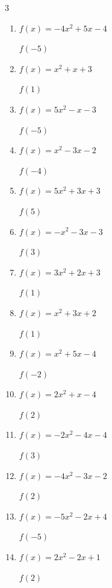 \begin{multicols}{3}
\begin{enumerate}
  \item $f(x)=-4x^{2}+5x-4$

$f(-5)$
        \phantom{$= -129$}

  \item $f(x)=x^{2}+x+3$

$f(1)$
        \phantom{$= 5$}

  \item $f(x)=5x^{2}-x-3$

$f(-5)$
        \phantom{$= 127$}

  \item $f(x)=x^{2}-3x-2$

$f(-4)$
        \phantom{$= 26$}

  \item $f(x)=5x^{2}+3x+3$

$f(5)$
        \phantom{$= 143$}

\columnbreak %

\resetques

  \item $f(x)=-x^{2}-3x-3$

$f(3)$
        \phantom{$= -21$}

  \item $f(x)=3x^{2}+2x+3$

$f(1)$
        \phantom{$= 8$}

  \item $f(x)=x^{2}+3x+2$

$f(1)$
        \phantom{$= 6$}

  \item $f(x)=x^{2}+5x-4$

$f(-2)$
        \phantom{$= -10$}

  \item $f(x)=2x^{2}+x-4$

$f(2)$
        \phantom{$= 6$}

  \item $f(x)=-2x^{2}-4x-4$

$f(3)$
        \phantom{$= -34$}

  \item $f(x)=-4x^{2}-3x-2$

$f(2)$
        \phantom{$= -24$}

  \item $f(x)=-5x^{2}-2x+4$

$f(-5)$
        \phantom{$= -111$}

  \item $f(x)=2x^{2}-2x+1$

$f(2)$
        \phantom{$= 5$}


\end{enumerate}
\end{multicols}

